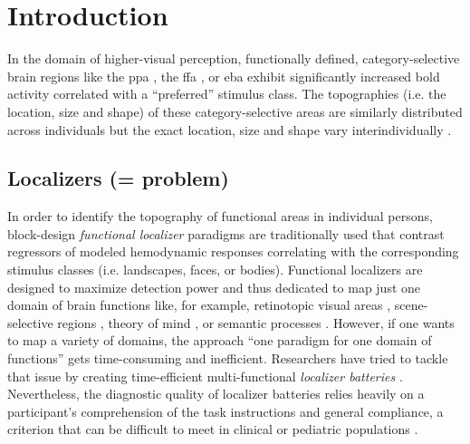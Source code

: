 

\section{Introduction}

In the domain of higher-visual perception, functionally defined,
category-selective brain regions like the \ac{ppa} \citep{epstein1998ppa}, the
\ac{ffa} \citep{kanwisher1997ffa}, or \ac{eba} \citep{downing2001bodyarea}
exhibit significantly increased \ac{bold} activity correlated with a
``preferred'' \citep{debeck2008interpreting} stimulus class.
%
The topographies (i.e. the location, size and shape) of these category-selective
areas are similarly distributed across individuals but the exact location, size
and shape vary interindividually \citep{rosenke2021probabilistic,
zhen2017quantifying, zhen2015quantifying, frost2012measuring}.


\subsection{Localizers (= problem)}


In order to identify the topography of functional areas in individual persons,
block-design \textit{functional localizer} paradigms are traditionally used that
contrast regressors of modeled hemodynamic responses correlating with the
corresponding stimulus classes (i.e. landscapes, faces, or bodies).
Functional localizers are designed to maximize detection power and thus
dedicated to map just one domain of brain functions like, for example,
retinotopic visual areas \citep{wang2015probabilistic}, scene-selective regions
\citep{stigliani2015temporal}, theory of mind \citep{spunt2014validating}, or
semantic processes \citep{fernandez2001language}.
However, if one wants to map a variety of domains, the approach ``one paradigm
for one domain of functions'' gets time-consuming and inefficient.
Researchers have tried to tackle that issue by creating time-efficient
multi-functional \textit{localizer batteries} \citep[e.g.,][]{barch2013function,
drobyshevsky2006rapid, pinel2007fast}.
Nevertheless, the diagnostic quality of localizer batteries relies heavily on a
participant's comprehension of the task instructions and general compliance, a
criterion that can be difficult to meet in clinical or pediatric populations
\citep{eickhoff2020towards, vanderwal2019movies}.



